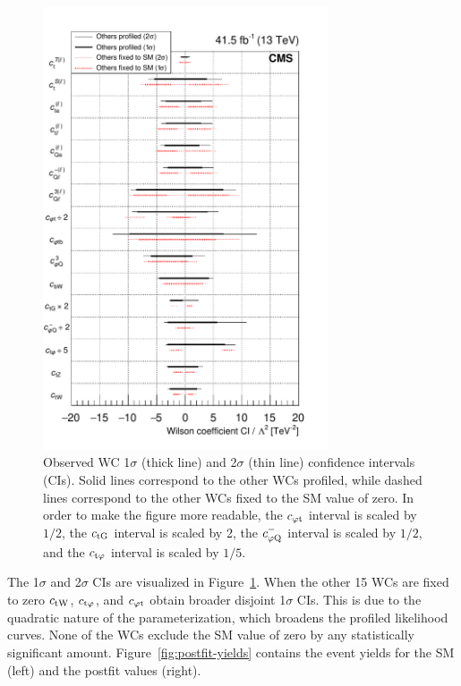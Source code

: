 \documentclass[12pt]{article}
\begin{document}
\begin{figure}[!htbp]
	\centering
	\includegraphics[width=0.75\textwidth]{plots/BestScan}
	\caption{Observed WC 1$\sigma$ (thick line) and 2$\sigma$ (thin line) confidence intervals (CIs). Solid lines correspond to the other WCs profiled, while dashed lines correspond to the other WCs fixed to the SM value of zero. In order to make the figure more readable, the $c_{\mathrm{\varphi t}}$ interval is scaled by $1/2$, the $c_{\mathrm{tG}}$ interval is scaled by 2, the $c^{-}_{\mathrm{\varphi Q}}$ interval is scaled by $1/2$, and the $c_{\mathrm{t\varphi}}$ interval is scaled by $1/5$.}
	\label{fig:SummaryPlot}
\end{figure}

The 1$\sigma$ and 2$\sigma$ CIs are visualized in Figure~\ref{fig:SummaryPlot}. When the other 15 WCs are fixed to zero $c_{\mathrm{tW}}$, $c_{\mathrm{t\varphi}}$, and $c_{\mathrm{\varphi t}}$ obtain broader disjoint 1$\sigma$ CIs. This is due to the quadratic nature of the parameterization, which broadens the profiled likelihood curves. None of the WCs exclude the SM value of zero by any statistically significant amount. Figure~\ref{fig:postfit-yields} contains the event yields for the SM (left) and the postfit values (right).
\end{document}
